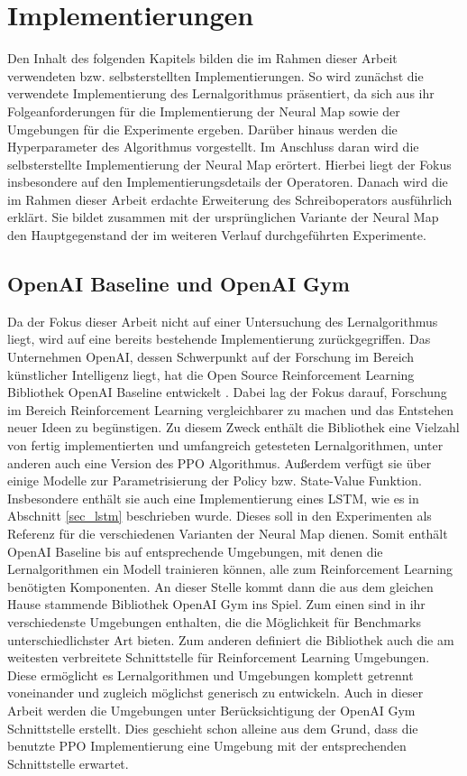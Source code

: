 \chapter{Implementierungen}
\label{chap_impl}

Den Inhalt des folgenden Kapitels bilden die im Rahmen dieser Arbeit verwendeten bzw. selbsterstellten Implementierungen. So wird zunächst die verwendete Implementierung des Lernalgorithmus präsentiert, da sich aus ihr Folgeanforderungen für die Implementierung der Neural Map sowie der Umgebungen für die Experimente ergeben. Darüber hinaus werden die Hyperparameter des Algorithmus vorgestellt. Im Anschluss daran wird die selbsterstellte Implementierung der Neural Map erörtert. Hierbei liegt der Fokus insbesondere auf den Implementierungsdetails der Operatoren. Danach wird die im Rahmen dieser Arbeit erdachte Erweiterung des Schreiboperators ausführlich erklärt. Sie bildet zusammen mit der ursprünglichen Variante der Neural Map den Hauptgegenstand der im weiteren Verlauf durchgeführten Experimente.


\section{OpenAI Baseline und OpenAI Gym}
\label{ppo_impl}

Da der Fokus dieser Arbeit nicht auf einer Untersuchung des Lernalgorithmus liegt, wird auf eine bereits bestehende Implementierung zurückgegriffen. Das Unternehmen OpenAI, dessen Schwerpunkt auf der Forschung im Bereich künstlicher Intelligenz liegt, hat die Open Source Reinforcement Learning Bibliothek OpenAI Baseline entwickelt \cite{Baselines}. Dabei lag der Fokus darauf, Forschung im Bereich Reinforcement Learning vergleichbarer zu machen und das Entstehen neuer Ideen zu begünstigen. Zu diesem Zweck enthält die Bibliothek eine Vielzahl von fertig implementierten und umfangreich getesteten Lernalgorithmen, unter anderen auch eine Version des PPO Algorithmus. Außerdem verfügt sie über einige Modelle zur Parametrisierung der Policy bzw. State-Value Funktion. Insbesondere enthält sie auch eine Implementierung eines LSTM, wie es in Abschnitt \ref{sec_lstm} beschrieben wurde. Dieses soll in den Experimenten als Referenz für die verschiedenen Varianten der Neural Map dienen. Somit enthält OpenAI Baseline bis auf entsprechende Umgebungen, mit denen die Lernalgorithmen ein Modell trainieren können, alle zum Reinforcement Learning benötigten Komponenten. An dieser Stelle kommt dann die aus dem gleichen Hause stammende Bibliothek OpenAI Gym ins Spiel. Zum einen sind in ihr verschiedenste Umgebungen enthalten, die die Möglichkeit für Benchmarks unterschiedlichster Art bieten. Zum anderen definiert die Bibliothek auch die am weitesten verbreitete Schnittstelle für Reinforcement Learning Umgebungen. Diese ermöglicht es Lernalgorithmen und Umgebungen komplett getrennt voneinander und zugleich möglichst generisch zu entwickeln. Auch in dieser Arbeit werden die Umgebungen unter Berücksichtigung der OpenAI Gym Schnittstelle erstellt. Dies geschieht schon alleine aus dem Grund, dass die benutzte PPO Implementierung eine Umgebung mit der entsprechenden Schnittstelle erwartet.

